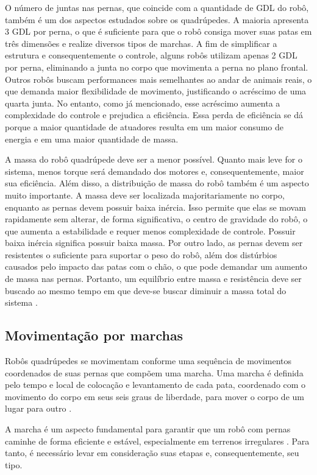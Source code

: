 \documentclass[conference]{IEEEtran}
\begin{document}
O número de juntas nas pernas, que coincide com a quantidade de GDL do robô, também é um dos aspectos estudados sobre os quadrúpedes. A maioria apresenta 3 GDL por perna, o que é suficiente para que o robô consiga mover suas patas em três dimensões e realize diversos tipos de marchas. A fim de simplificar a estrutura e consequentemente o controle, alguns robôs utilizam apenas 2 GDL por perna, eliminando a junta no corpo que movimenta a perna no plano frontal. Outros robôs buscam performances mais semelhantes ao andar de animais reais, o que demanda maior flexibilidade de movimento, justificando o acréscimo de uma quarta junta. No entanto, como já mencionado, esse acréscimo aumenta a complexidade do controle e prejudica a eficiência. Essa perda de eficiência se dá porque a maior quantidade de atuadores resulta em um maior consumo de energia e em uma maior quantidade de massa.

A massa do robô quadrúpede deve ser a menor possível. Quanto mais leve for o sistema, menos torque será demandado dos motores e, consequentemente, maior sua eficiência. Além disso, a distribuição de massa do robô também é um aspecto muito importante. A massa deve ser localizada majoritariamente no corpo, enquanto as pernas devem possuir baixa inércia. Isso permite que elas se movam rapidamente sem alterar, de forma significativa, o centro de gravidade do robô, o que aumenta a estabilidade e requer menos complexidade de controle. Possuir baixa inércia significa possuir baixa massa. Por outro lado, as pernas devem ser resistentes o suficiente para suportar o peso do robô, além dos distúrbios causados pelo impacto das patas com o chão, o que pode demandar um aumento de massa nas pernas. Portanto, um equilíbrio entre massa e resistência deve ser buscado ao mesmo tempo em que deve-se buscar diminuir a massa total do sistema \cite{Zhong2019}.

\subsection{Movimentação por marchas}
Robôs quadrúpedes se movimentam conforme uma sequência de movimentos coordenados de suas pernas que compõem uma marcha. Uma marcha é definida pelo tempo e local de colocação e levantamento de cada pata, coordenado com o movimento do corpo em seus seis graus de liberdade, para mover o corpo de um lugar para outro  \cite{Song1989}.

A marcha é um aspecto fundamental para garantir que um robô com pernas caminhe de forma eficiente e estável, especialmente em terrenos irregulares \cite{X.129}. Para tanto, é necessário levar em consideração suas etapas e, consequentemente, seu tipo.
\end{document}
